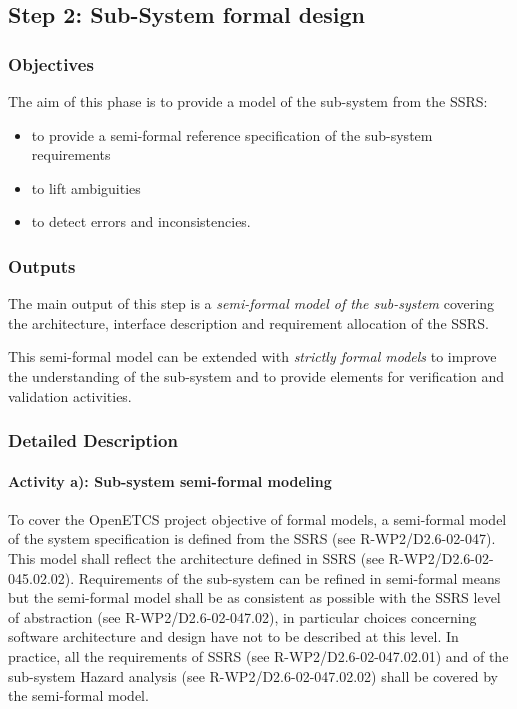 \subsection{Step 2: Sub-System formal design}
\label{sec:subsyst-formal-design}



\subsubsection{Objectives}
\label{sec:sys-fm-objective}

The aim of this phase is to provide a model of the sub-system from the SSRS:

\begin{itemize}
\item to provide a semi-formal reference specification of the sub-system requirements
\item to lift ambiguities
\item to detect errors and inconsistencies.
\end{itemize}


\subsubsection{Outputs}
\label{sec:sys-fm-outputs}


The main output of this step is a \textit{semi-formal model of the sub-system}  covering the architecture, interface description and requirement allocation of the SSRS.

This semi-formal model can be extended with \textit{strictly formal models} to improve the understanding of the sub-system and to provide elements for verification and validation activities.

\subsubsection{Detailed Description}
\label{sec:sys-dev-deta-descr}


\paragraph{Activity a): Sub-system semi-formal modeling} To cover the OpenETCS project objective  of formal models, a semi-formal model of the system  specification is defined from  the SSRS (see R-WP2/D2.6-02-047). This model shall reflect the architecture defined in SSRS (see R-WP2/D2.6-02-045.02.02). Requirements of the sub-system can be refined in semi-formal means but the semi-formal model  shall be as consistent as possible with the SSRS level of abstraction (see R-WP2/D2.6-02-047.02), in particular choices concerning software architecture and design have not to be described at this level.
In practice, all the requirements of SSRS (see R-WP2/D2.6-02-047.02.01) and of the sub-system Hazard analysis (see R-WP2/D2.6-02-047.02.02) shall be covered by the semi-formal model.

